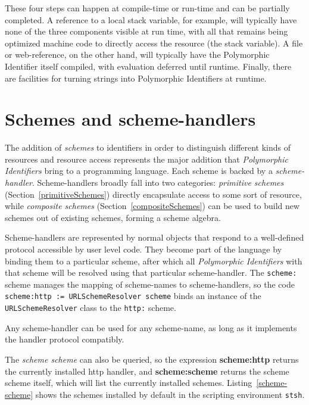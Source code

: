 \documentclass[preprint]{sigplanconf}
\begin{document}
These four steps can happen at compile-time or run-time and can be partially completed.
A reference to a local stack variable, for example, will typically have none of the
three components visible at run time, with all that remains being optimized 
machine code to directly access the resource (the stack variable).
A file or web-reference, on the other hand, will typically have the Polymorphic Identifier itself
compiled, with evaluation deferred until runtime.  Finally, there are facilities
for turning strings into Polymorphic Identifiers at runtime.


\section{Schemes and scheme-handlers}
\label{schemes}
The addition of \emph{schemes} to identifiers in order to distinguish different kinds of resources
and resource access represents
the major addition that \emph{Polymorphic Identifiers} bring to a programming language.
Each scheme is backed by a \emph{scheme-handler}.  Scheme-handlers broadly fall into two categories:
 \emph{primitive schemes} (Section~\ref{primitiveSchemes})
directly encapsulate access to some sort of resource, while \emph{composite schemes} (Section~\ref{compositeSchemes})
can be used to build new schemes out of existing schemes, forming a scheme algebra.

\sloppy   %

Scheme-handlers are represented by normal objects that respond to a well-defined protocol 
accessible by user level code.  They
become part of the language by binding them to a particular scheme, after which
all \emph{Polymorphic Identifiers} with that scheme will be resolved using that particular scheme-handler.
The {\tt scheme:} scheme manages the mapping of scheme-names to scheme-handlers, so the code 
{\tt scheme:http := URLSchemeResolver scheme} binds an instance of the {\tt URLSchemeResolver} class
to the {\tt http:} scheme.

\fussy

 Any scheme-handler
can be used for any scheme-name, as long as it implements the handler protocol
compatibly.


The \emph{scheme scheme} can also be queried,
so the expression {\bf scheme:http} returns the currently installed http handler, and 
{\bf scheme:scheme} returns the scheme scheme itself, which will list the currently
installed schemes.  Listing~\ref{scheme-scheme} shows the schemes installed by
default in the scripting environment {\tt stsh}.
\end{document}
